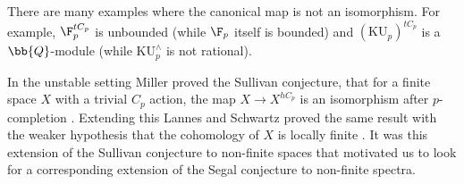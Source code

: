 \begin{comment}
Since $i$ is symmetric monoidal we have $i(\bb{S}) = \bb{S}_{G}$ and since $i$ is also a left adjoint for any $X \in \rm{Sp}, \ i(X) = i(\bb{S}) \otimes X$\footnote{Which makes sense, since $\rm{Sp}_{G}$ is a stable, presentably symmetric monoidal $\infty$-category, so we can tensor with respect any object $X \in \rm{Sp}$}. 

We can then ask the following question:

\begin{ques} \label{segalques}
    For a spectrum $X$ and $G = C_p$, is the map $i(X)^{G} \rightarrow i(X)^{hG}$ is an isomorphism after $p$-completion ? or equivalently, is the map $X \rightarrow X^{tC_p}$ is an isomorphism after $p$-completion, where the underlying action on the spectrum is trivial?.
\end{ques}

\begin{rmk}
    By Theorem \ref{linmainthm} and observing both $p$-completion and Tate construction are exact, we can say the answer to \ref{segalques} is true if $X$ is a finite spectrum.
\end{rmk}

In this note, we extend this result beyond finite spectra and give some examples of non-finite spectra that satisfy the version of the Segal conjecture mentioned above.

    
\end{comment}


\begin{rmk}
    There are many examples where the canonical map is not an isomorphism.
    For example, 
    $\F_p^{tC_p}$ is unbounded (while $\F_p$ itself is bounded) and
    $(\mathrm{KU}_p)^{tC_p}$ is a $\bb{Q}$-module (while $\mathrm{KU}^{\wedge}_{p}$ is not rational). 
\end{rmk}

\begin{rmk}
    In the unstable setting Miller proved the Sullivan conjecture, that for a finite space $X$ with a trivial $C_p$ action, the map $X \rightarrow X^{hC_p}$ is an isomorphism after $p$-completion \cite{miller1984sullivan}.
    Extending this Lannes and Schwartz proved the same result with the weaker hypothesis that the cohomology of $X$ is locally finite \cite{lannes1986conjectures}. 
    It was this extension of the Sullivan conjecture to non-finite spaces that motivated us to look for a corresponding extension of the Segal conjecture to non-finite spectra.
\end{rmk}

